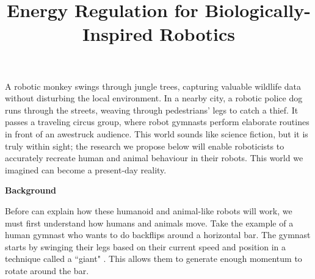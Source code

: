 \documentclass[a4paper,12pt]{article}
\begin{document}
\title{Energy Regulation for Biologically-Inspired Robotics}
\author{}
\date{}
\maketitle

\vspace{-1.2cm} %

A robotic monkey swings through jungle trees, capturing valuable
wildlife data without disturbing the local environment. 
In a nearby city, a robotic police dog runs through the streets, weaving through
pedestrians' legs to catch a thief.
It passes a traveling circus group, where robot gymnasts perform elaborate
routines in front of an awestruck audience.
This world sounds like science fiction, but it is truly within sight;
the research we propose below will enable roboticists to accurately recreate
human and animal behaviour in their robots.
This world we imagined can become a present-day reality.

\begin{large}
\textbf{Background}
\end{large}

Before can explain how these humanoid and animal-like robots will work, we
must first understand how humans and animals move. 
Take the example of a human gymnast who  wants to do backflips around a
horizontal bar. 
The gymnast starts by swinging their legs based on their current speed and
position in a technique called a ``giant" \cite{usagym_giant}. 
This allows them to generate enough momentum to rotate around the bar.
\end{document}

